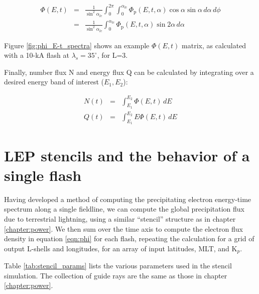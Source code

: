 \begin{eqnarray}
\Phi(E,t)& = &\frac{1}{\sin^2\alpha_{lc}}\int_0^{2\pi}\int_0^{\alpha_{lc}}\Phi_\mathrm{p}(E,t,\alpha) \cos\alpha \sin\alpha\,d\alpha\,d\phi \\
&=& \frac{1}{\sin^2\alpha_{lc}} \int_0^{\alpha_{lc}}\Phi_\mathrm{p}(E,t,\alpha) \sin 2\alpha\,d\alpha
\label{eqn:phi}
\end{eqnarray}

Figure \ref{fig:phi_E-t_spectra} shows an example $\Phi(E,t)$ matrix, as calculated with a 10-kA flash at $\lambda_s=35^\circ$, for L=3.


Finally, number flux N and energy flux Q can be calculated by integrating over a desired energy band of interest ($E_1, E_2$):

\begin{eqnarray}
N(t) &=& \int_{E_1}^{E_2} \Phi(E,t)\,dE \\
Q(t) &=& \int_{E_1}^{E_2} E \Phi(E,t)\,dE
\end{eqnarray}



\section{LEP stencils and the behavior of a single flash}
\label{section:lep_stencils}
Having developed a method of computing the precipitating electron energy-time spectrum along a single fieldline, we can compute the global precipitation flux due to terrestrial lightning, using a similar ``stencil'' structure as in chapter \ref{chapter:power}. We then sum over the time axis to compute the electron flux density in equation \eqref{eqn:phi} for each flash, repeating the calculation for a grid of output L-shells and longitudes, for an array of input latitudes, MLT, and K$_p$.

Table \ref{tab:stencil_params} lists the various parameters used in the stencil simulation. The collection of guide rays are the same as those in chapter \ref{chapter:power}.


